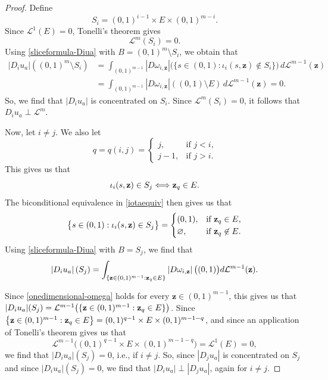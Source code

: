 \documentclass[10pt,a4paper]{amsart}
\begin{document}
\begin{proof}
Define
\begin{equation}\label{threeCartesian}
S_i=(0,1)^{i-1}\times E\times(0,1)^{m-i}.
\end{equation}
 Since \(\mathcal L^1(E)=0\), Tonelli's theorem gives
\begin{equation}\label{LmSi0}
\mathcal L^m(S_i)=0.
\end{equation}
 Using \eqref{sliceformula-Diua} with \(B=(0,1)^m\setminus S_i\), we obtain that 
$$ \begin{aligned}
|D_i u_a|((0,1)^m\setminus S_i)
&=
\int_{(0,1)^{m-1}}
|D\omega_{i,\mathbf z}|
\bigl(\{s\in(0,1):\iota_i(s,\mathbf z)\notin S_i\}\bigr)
\,d\mathcal L^{m-1}(\mathbf z) \\[4pt]
&=
\int_{(0,1)^{m-1}}
|D\omega_{i,\mathbf z}|((0,1)\setminus E)
\,d\mathcal L^{m-1}(\mathbf z)
=
0.
\end{aligned}
$$ So, we find that $|D_i u_a|$ is concentrated on $S_i$. Since \(\mathcal L^m(S_i)=0\), it follows that $ D_i u_a\perp\mathcal L^m$. 

 Now, let $i \neq j$. We also let $$ q = q(i, j) = \begin{cases} 
 j, & \text{if $j < i$,} \\
 j - 1, & \text{if $j > i$.} 
 \end{cases} $$
 This gives us that 
\begin{equation}\label{iotaequiv} 
 \iota_{i}(s, \text{{\bf z}}) \in S_{j} \Longleftrightarrow \text{{\bf z}}_{q} \in E. 
\end{equation} 
 The biconditional equivalence in \eqref{iotaequiv} then gives us that $$ \big\{ s \in (0, 1) : \iota_{i}(s, \text{{\bf z}}) \in S_{j} \big\} = \begin{cases} 
 (0, 1), & \text{if $\text{{\bf z}}_{q} \in E$,} \\
 \varnothing, & \text{if $\text{{\bf z}}_{q} \not\in E$.} 
 \end{cases} $$
 Using \eqref{sliceformula-Diua} with \(B=S_j\), we find that $$\left| D_{i}u_{a} \right|(S_{j}) = \int_{ \{ \text{{\bf z}} \in (0, 1)^{m-1} : \text{{\bf z}}_{q} \in E \} } \left| D \omega_{i, 
 \text{{\bf z}}} \right|\big( (0, 1) \big) d\mathcal{L}^{m-1}(\text{{\bf z}}).$$ 

 Since \eqref{onedimensional-omega} holds for every $\mathbf z\in(0,1)^{m-1}$, this gives us that $|D_{i} u_{a}|(S_{j}) = \mathcal{L}^{m-1}\big( \{ \text{{\bf z}} \in (0, 1)^{m - 
 1} : \text{{\bf z}}_{q} \in E \} \big)$. Since $ \big\{ \text{{\bf z}} \in (0, 1)^{m-1} : \text{{\bf z}}_{q} \in E \big\} = (0, 1)^{q-1} \times E \times (0, 1)^{m-1-q}$, and since an application 
 of Tonelli's theorem gives us that $$\mathcal{L}^{m-1}\big( (0, 1)^{q-1} \times E \times (0, 1)^{m-1-q} \big)
 = \mathcal{L}^{1}(E) = 0,$$ 
 we find that $\left| D_{i}u_a \right|(S_{j}) = 0$, i.e., if $i \neq j$. 
 So, since $\left| D_{j} u_a \right|$ is concentrated on $S_{j}$
 and since $\left| D_{i} u_{a} \right|(S_{j}) = 0$, 
 we find that $\left| D_{i} u_{a} \right| \perp \left| D_{j} u_{a} \right|$, again for $i \neq j$. 


\end{proof}
\end{document}
